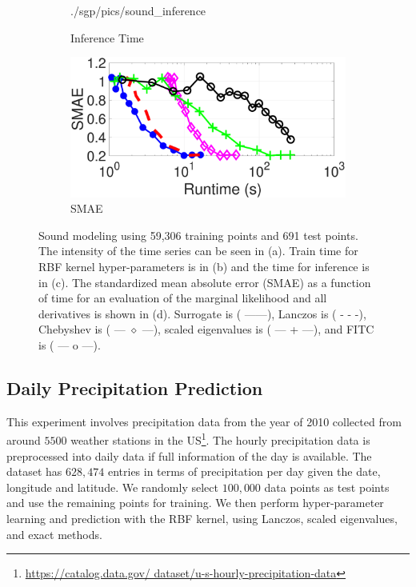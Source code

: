 \begin{figure}[ht]
\begin{center}
\begin{subfigure}{0.47\textwidth}
      {./sgp/pics/sound_inference}
      \caption{Inference Time}\label{fig:sound_inference}
    \end{subfigure}
    \begin{subfigure}{0.47\textwidth}
      \includegraphics[width=\textwidth,trim=0.4cm 0cm 2.5cm 0.5cm,clip]
      {./sgp/pics/sound_smae}
      \caption{SMAE}\label{fig:sound_smae}
    \end{subfigure}
  \end{center}
  \caption{Sound modeling using 59,306 training points and 691 test points. The
  intensity of the time series can be seen in (a). Train time for RBF kernel
  hyper\hyp{}parameters is in (b) and the time for inference is in (c). The
  standardized mean absolute error (SMAE) as a function of time for an
  evaluation of the marginal likelihood and all derivatives is shown in (d).
  Surrogate is ({\color{blue} ------}), Lanczos is ({\color{red} - - -}),
  Chebyshev is {(\color{magenta} --- $\diamond$ ---}), scaled eigenvalues is ({
  \color{green} --- + ---}), and FITC is ({\color{black} --- o ---}).}
  \label{fig:sound_modeling}
\end{figure}

\subsection{Daily Precipitation Prediction}

This experiment involves precipitation data from the year of 2010 collected from
around $5500$ weather stations in the US\footnote{\url{https://catalog.data.gov/
dataset/u-s-hourly-precipitation-data}}. The hourly precipitation data is
preprocessed into daily data if full information of the day is available. The
dataset has $628,474$ entries in terms of precipitation per day given the date,
longitude and latitude. We randomly select $100,000$ data points as test points
and use the remaining points for training. We then perform hyper\hyp{}parameter
learning and prediction with the RBF kernel, using Lanczos, scaled eigenvalues,
and exact methods.

